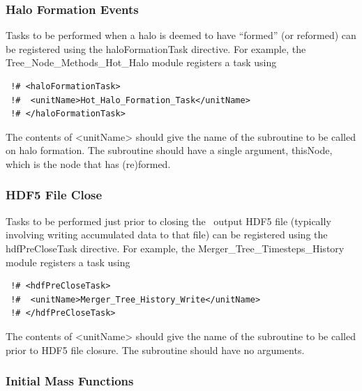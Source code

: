 \subsubsection{Halo Formation Events}\label{sec:HaloFormationEvents}

Tasks to be performed when a halo is deemed to have ``formed'' (or reformed) can be registered using the {\normalfont \ttfamily haloFormationTask} directive. For example, the {\normalfont \ttfamily Tree\_Node\_Methods\_Hot\_Halo} module registers a task using
\begin{verbatim}
 !# <haloFormationTask>
 !#  <unitName>Hot_Halo_Formation_Task</unitName>
 !# </haloFormationTask>
\end{verbatim}
The contents of {\normalfont \ttfamily <unitName>} should give the name of the subroutine to be called on halo formation. The subroutine should have a single argument, {\normalfont \ttfamily thisNode}, which is the node that has (re)formed.

\subsubsection{HDF5 File Close}\label{sec:HDFFileClose}

Tasks to be performed just prior to closing the \glc\ output HDF5 file (typically involving writing accumulated data to that file) can be registered using the {\normalfont \ttfamily hdfPreCloseTask} directive. For example, the {\normalfont \ttfamily Merger\_Tree\_Timesteps\_History} module registers a task using
\begin{verbatim}
 !# <hdfPreCloseTask>
 !#  <unitName>Merger_Tree_History_Write</unitName>
 !# </hdfPreCloseTask>
\end{verbatim}
The contents of {\normalfont \ttfamily <unitName>} should give the name of the subroutine to be called prior to HDF5 file closure. The subroutine should have no arguments.

\subsubsection{Initial Mass Functions}\label{sec:imfTasks}

